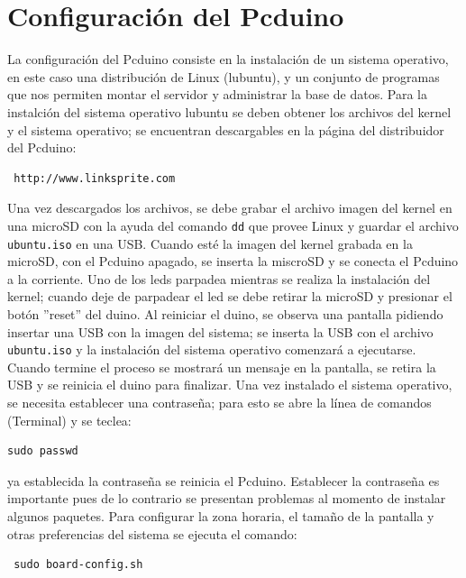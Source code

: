 \documentclass[a4paper,10pt,titlepage]{article}
\begin{document}
\section{Configuraci\'on del Pcduino}
La configuraci\'on del Pcduino consiste en la instalaci\'on de un sistema operativo, en este caso una distribuci\'on de Linux (lubuntu), y un conjunto 
de programas que nos permiten montar el servidor y administrar la base de datos. Para la instalci\'on del sistema operativo lubuntu se deben obtener los archivos del 
kernel y el sistema operativo; se encuentran descargables 
en la 
p\'agina del distribuidor del Pcduino: 
\begin{verbatim}
 http://www.linksprite.com 
\end{verbatim}
Una vez descargados los archivos, se debe grabar el archivo imagen del kernel en una microSD con la ayuda 
del comando 
\verb|dd| que provee Linux y guardar el archivo \verb|ubuntu.iso| en una 
USB. Cuando est\'e la imagen del kernel grabada en la microSD, con el Pcduino apagado, se inserta la miscroSD y se conecta el Pcduino a la corriente. Uno de los leds 
parpadea mientras se realiza la instalaci\'on del kernel; cuando deje de parpadear el led se debe retirar la microSD y presionar el bot\'on ''reset'' del duino. Al 
reiniciar el duino, se observa una pantalla pidiendo insertar una USB con la imagen del sistema; se inserta la USB con el archivo \verb|ubuntu.iso| y la instalaci\'on 
del sistema operativo comenzar\'a a ejecutarse. Cuando termine el proceso se mostrar\'a un mensaje en la pantalla, se retira la USB y se reinicia el duino para 
finalizar. Una vez instalado el sistema operativo, se necesita establecer una 
contrase\~na; para esto se abre la l\'inea de comandos (Terminal) y se teclea:
\begin{verbatim}
sudo passwd
\end{verbatim}
ya establecida la contrase\~na se reinicia el Pcduino. Establecer la contrase\~na es importante pues de lo contrario se presentan problemas al momento de 
instalar algunos paquetes. Para configurar la zona horaria, el tama\~no de la pantalla y otras 
preferencias del sistema se ejecuta el comando:

\begin{verbatim}
 sudo board-config.sh 
\end{verbatim}
\end{document}

